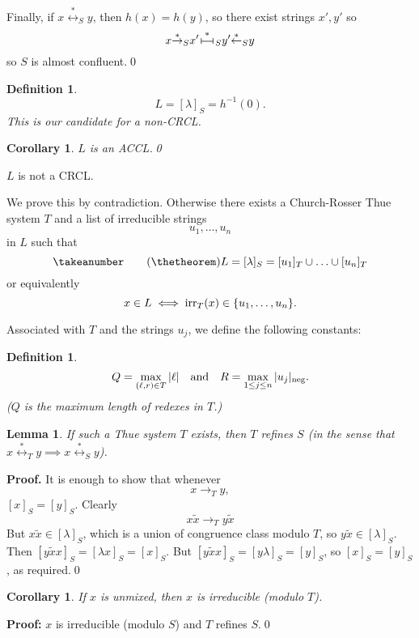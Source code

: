 \documentclass[12pt,a4paper]{article}
\newtheorem{definition}[theorem]{Definition}
\newtheorem{lemma}[theorem]{Lemma}
\newtheorem{corollary}[theorem]{Corollary}
\newcommand{\redstar}{{\overset{*}{\rightarrow}}}
\newcommand{\thuecong}{{\overset{*}{\leftrightarrow}}}
\newcommand{\irr}{{\text{\rm irr}}}
\newcommand{\pres}{\,
{\vrule height5pt width.5pt depth0pt
\overset{\vrule height.5pt width10pt depth0pt}
{\vrule height0pt width0pt depth0pt}
\vrule height5pt width.5pt depth0pt}\,}
\newcommand{\presstar}{{\overset{*}{\pres}}}
\numberwithin{equation}{section}
\renewcommand{\neg}{{\text{\rm neg}}}
\newcommand{\be}{\begin{equation*}}
\newcommand{\ee}{\end{equation*}}
\begin{document}
Finally, if $x {\thuecong}_S y$, then $h(x) = h(y)$,
so there exist strings $x', y'$ so
\be
x {\redstar}_S x' {\presstar}_S y' 
{\overset{*}{\leftarrow}}_S y
\ee
so $S$ is almost confluent.\qed


\begin{definition}
\be
L = [\lambda]_S = h^{-1}(0).
\ee
This is our candidate for a non-CRCL.
\end{definition}

\begin{corollary}
$L$ is an ACCL.\qed
\end{corollary}

\begin{theorem}
\label{thm: main}
$L$ is not a CRCL.
\end{theorem}

We prove this by contradiction. Otherwise there exists
a Church-Rosser Thue system $T$ and a list  of irreducible strings
\be
u_1,\ldots, u_n
\ee
in $L$ such that
\be
\takeanumber
\tag{\thetheorem}
\label{eq: union}
L = [\lambda]_S = [u_1]_T \cup \ldots \cup [u_n]_T
\ee
or equivalently
\be
x \in L \iff \irr_T(x) \in \{u_1, \ldots, u_n\}.
\ee

Associated with $T$ and the strings $u_j$, we define the
following constants:
\begin{definition}
\label{def: QR}
\be
Q = \max_{(\ell,r)\in T} |\ell|
\quad\text{and}\quad
R = \max_{1\leq j\leq n}|u_j|_\neg.
\ee
($Q$ is the maximum length of redexes in $T$.)
\end{definition}

\begin{lemma}
\label{lem: T refines}
If such a Thue system $T$ exists, then $T$
refines $S$ (in the sense
that $x\thuecong_T y \implies x \thuecong_S y$).
\end{lemma}

{\bf Proof.}  It is enough to show that whenever
\be
x \to_T y,
\ee
$[x]_S = [y]_S$. Clearly
\be
x\tilde{x} \to_T y\tilde{x}
\ee
But $x\tilde{x} \in [\lambda]_S$, which is a union of
congruence class modulo $T$, so $y\tilde{x} \in [\lambda]_S$.
Then $[y\tilde{x} x]_S = [\lambda x]_S = [x]_S$.
But $[y\tilde{x}x]_S = [y\lambda]_S = [y]_S$, so
$[x]_S = [y]_S$, as required.\qed

\begin{corollary}
If $x$ is unmixed, then $x$ is irreducible (modulo $T$).
\end{corollary}

{\bf Proof:} $x$ is irreducible (modulo $S$) and $T$ refines
$S$.\qed
\end{document}
